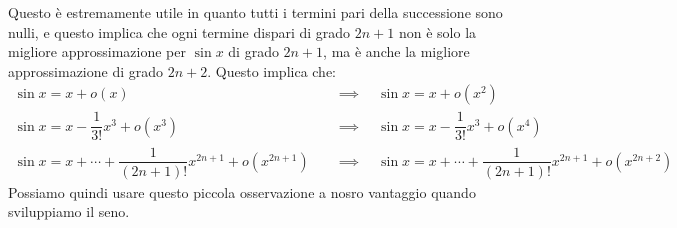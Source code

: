 
Questo è estremamente utile in quanto tutti i termini pari della successione sono nulli, e questo implica che ogni termine dispari di grado $2n + 1$ non è solo la migliore approssimazione per $\sin{x}$ di grado $2n + 1$, ma è anche la migliore approssimazione di grado $2n + 2$. Questo implica che:
\begin{align*}
	\sin{x} = x + o(x) \quad &\implies \quad \sin{x} = x + o(x^2)\\[5pt]
	\sin{x} = x - \dfrac{1}{3!}x^3 + o(x^3) \quad &\implies \quad \sin{x} = x - \dfrac{1}{3!}x^3 + o(x^4) \\[5pt]
	\sin{x} = x + \cdots + \dfrac{1}{(2n+1)!} x^{2n +1} + o(x^{2n+1}) \quad &\implies \quad \sin{x} = x + \cdots + \dfrac{1}{(2n+1)!} x^{2n+1} + o(x^{2n+2})
\end{align*}
Possiamo quindi usare questo piccola osservazione a nosro vantaggio quando sviluppiamo il seno.\\

